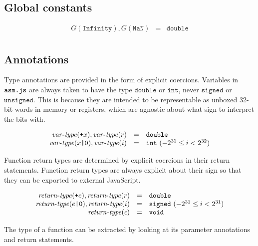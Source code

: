 \documentclass{article}
\newcommand{\vartype}{\mathit{var}\mbox{-}\mathit{type}}
\newcommand{\rettype}{\mathit{return}\mbox{-}\mathit{type}}
\newcommand{\mathjs}[1]{\mbox{\texttt{{#1}}}}
\newcommand{\unsigned}{\mathtt{unsigned}}
\newcommand{\signed}{\mathtt{signed}}
\newcommand{\double}{\mathtt{double}}
\newcommand{\void}{\mathtt{void}}
\newcommand{\todouble}[1]{\mathjs{+}{#1}}
\renewcommand{\int}{\mathtt{int}}
\begin{document}
\subsection{Global constants}

\[
\begin{array}{rcl}
G(\mathtt{Infinity}), G(\mathtt{NaN}) & = & \double \\
\end{array}
\]

\subsection{Annotations}

Type annotations are provided in the form of explicit
coercions. Variables in $\mathjs{asm.js}$ are always taken to have the
type $\double$ or $\int$, never $\signed$ or $\unsigned$. This is
because they are intended to be representable as unboxed 32-bit words
in memory or registers, which are agnostic about what sign to
interpret the bits with.

\[
\begin{array}{rcl}
\vartype(\todouble{x}), \vartype(r) & = & \double \\
\vartype(x\mathjs{|0}), \vartype(i) & = & \int \mbox{ $(-2^{31} \leq i < 2^{32})$}
\end{array}
\]

Function return types are determined by explicit coercions in their
return statements. Function return types are always explicit about
their sign so that they can be exported to external JavaScript.

\[
\begin{array}{rcl}
\rettype(\todouble{e}), \rettype(r) & = & \double \\
\rettype(e\mathjs{|0}), \rettype(i) & = & \signed \mbox{ $(-2^{31} \leq i < 2^{31})$} \\
\rettype(\epsilon)                  & = & \void \\
\end{array}
\]

The type of a function can be extracted by looking at its parameter
annotations and return statements.
\end{document}

